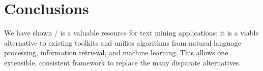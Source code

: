 \section{Conclusions}

We have shown \meta/ is a valuable resource for text mining applications; it is
a viable alternative to existing toolkits and unifies algorithms from natural
language processing, information retrieval, and machine learning. This allows
one extensible, consistent framework to replace the many disparate alternatives.
